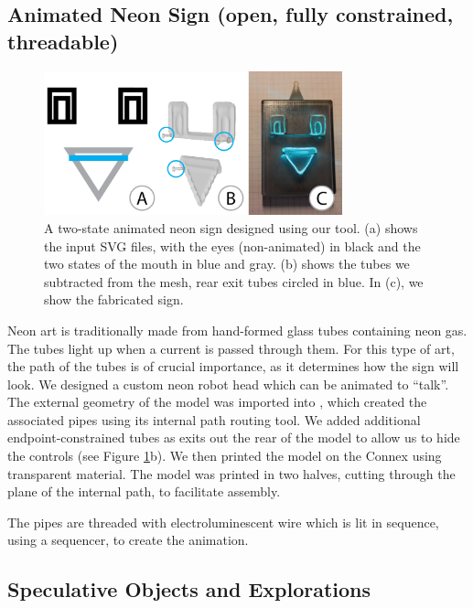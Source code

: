 \subsection{Animated Neon Sign (open, fully constrained, threadable)}

\begin{figure}[t]
\centering
    \includegraphics[width=3.4in]{figures/sign.png}
\caption{A two-state animated neon sign designed using our tool.  (a) shows the input SVG files, with the eyes (non-animated) in black and the two states of the mouth in {\color{blue}blue} and {\color{gray}gray}.  (b) shows the tubes we subtracted from the mesh, rear exit tubes circled in {\color{blue}blue}. In (c), we show the fabricated sign.}
\label{fig:neon}
\end{figure}

Neon art is traditionally made from hand-formed glass tubes containing neon gas.  The tubes light up when a current is passed through them.  For this type of art, the path of the tubes is of crucial importance, as it determines how the sign will look.  We designed a custom neon robot head which can be animated to ``talk''. 
The external geometry of the model was imported into \systemnamenospace, which created the associated pipes using its internal path routing tool.  We added additional endpoint-constrained tubes as exits out the rear of the model to allow us to hide the controls (see Figure \ref{fig:neon}b).  We then printed the model on the Connex using transparent material. The model was printed in two halves, cutting through the plane of the internal path, to facilitate assembly. 

The pipes are threaded with electroluminescent wire which is lit in sequence, using a sequencer, to create the animation.

\subsection{Speculative Objects and Explorations}

